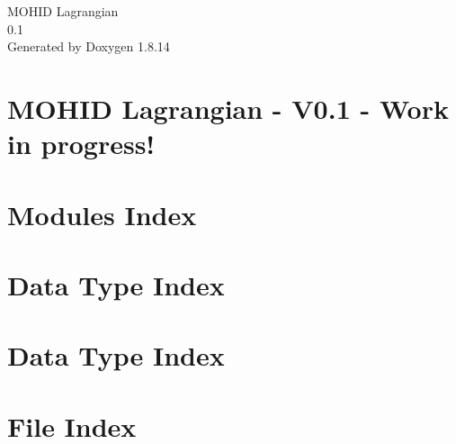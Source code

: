 \documentclass[twoside]{book}
\newcommand{\+}{\discretionary{\mbox{\scriptsize$\hookleftarrow$}}{}{}}
\newcommand{\clearemptydoublepage}{%
  \newpage{\pagestyle{empty}\cleardoublepage}%
}
\begin{document}
\hypersetup{pageanchor=false,
             bookmarksnumbered=true,
             pdfencoding=unicode
            }
\begin{titlepage}
\vspace*{7cm}
\begin{center}%
{\Large M\+O\+H\+ID Lagrangian \\[1ex]\large 0.\+1 }\\
\vspace*{1cm}
{\large Generated by Doxygen 1.8.14}\\
\end{center}
\end{titlepage}
\clearemptydoublepage
{}
\tableofcontents
\clearemptydoublepage
{}
\hypersetup{pageanchor=true}

\chapter{M\+O\+H\+ID Lagrangian -\/ V0.1 -\/ Work in progress!}
\label{index}\hypertarget{index}{}
\chapter{Modules Index}

\chapter{Data Type Index}

\chapter{Data Type Index}

\chapter{File Index}

\end{document}
